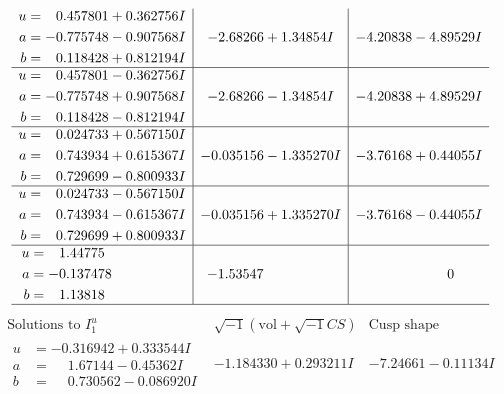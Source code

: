 \documentclass[1p]{elsarticle_modified}
\theoremstyle{definition}
\newcommand{\I}{\sqrt{-1}}
\begin{document}
$$\begin{array}{c|c|c}
\begin{aligned}
u &= \phantom{-}0.457801 + 0.362756 I \\
a &= -0.775748 - 0.907568 I \\
b &= \phantom{-}0.118428 + 0.812194 I\end{aligned}
 & -2.68266 + 1.34854 I & -4.20838 - 4.89529 I \\ \hline\begin{aligned}
u &= \phantom{-}0.457801 - 0.362756 I \\
a &= -0.775748 + 0.907568 I \\
b &= \phantom{-}0.118428 - 0.812194 I\end{aligned}
 & -2.68266 - 1.34854 I & -4.20838 + 4.89529 I \\ \hline\begin{aligned}
u &= \phantom{-}0.024733 + 0.567150 I \\
a &= \phantom{-}0.743934 + 0.615367 I \\
b &= \phantom{-}0.729699 - 0.800933 I\end{aligned}
 & -0.035156 - 1.335270 I & -3.76168 + 0.44055 I \\ \hline\begin{aligned}
u &= \phantom{-}0.024733 - 0.567150 I \\
a &= \phantom{-}0.743934 - 0.615367 I \\
b &= \phantom{-}0.729699 + 0.800933 I\end{aligned}
 & -0.035156 + 1.335270 I & -3.76168 - 0.44055 I \\ \hline\begin{aligned}
u &= \phantom{-}1.44775\phantom{ +0.000000I} \\
a &= -0.137478\phantom{ +0.000000I} \\
b &= \phantom{-}1.13818\phantom{ +0.000000I}\end{aligned}
 & -1.53547\phantom{ +0.000000I} & \phantom{-0.000000 } 0\\
 \hline 
 \end{array}$$\newpage$$\begin{array}{c|c|c}  
\text{Solutions to }I^u_{1}& \I (\text{vol} + \sqrt{-1}CS) & \text{Cusp shape}\\
 \hline 
\begin{aligned}
u &= -0.316942 + 0.333544 I \\
a &= \phantom{-}1.67144 - 0.45362 I \\
b &= \phantom{-}0.730562 - 0.086920 I\end{aligned}
 & -1.184330 + 0.293211 I & -7.24661 - 0.11134 I \\ \hline\begin{aligned}

\end{aligned}
\end{array}$$
\end{document}
